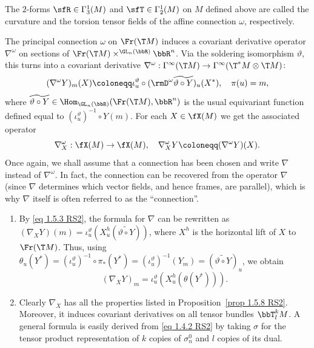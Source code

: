 \begin{defn}
    The $2$-forms $\sfR\in \Gamma_3^1(M)$ and $\sfT\in\Gamma_2^1(M)$ on $M$ defined above are called the curvature and the torsion tensor fields of the affine connection $\omega$, respectively.
\end{defn}


The principal connection $\omega$ on $\Fr(\T M)$ induces a covariant derivative operator $\nabla^\omega$ on sections of $\Fr(\T M)\times^{\GL_n(\bbR)}\bbR^n$. Via the soldering isomorphism $\vartheta$, this turns into a covariant derivative $\nabla^\omega:\Gamma^\infty(\T M)\to \Gamma^\infty(\T^\ast M\otimes \T M)$:
\[(\nabla^\omega Y)_m(X)\coloneqq \iota_u^\vartheta\circ (\rmD^\omega \widetilde{\vartheta\circ Y})_u(X^\ast),\quad \pi(u)=m,\]
where $\widetilde{\vartheta\circ Y}\in\Hom_{\GL_n(\bbR)}(\Fr(\T M),\bbR^n)$ is the usual equivariant function defined equal to $(\iota_u^\vartheta)^{-1}\circ Y(m)$. For each $X\in\fX(M)$ we get the associated operator
\[\nabla_X^\omega:\fX(M)\to \fX(M),\quad \nabla_X^\omega Y\coloneqq (\nabla^\omega Y)(X).\]
Once again, we shall assume that a connection has been chosen and write $\nabla$ instead of $\nabla^\omega$. In fact, the connection can be recovered from the operator $\nabla$ (since $\nabla$ determines which vector fields, and hence frames, are parallel), which is why $\nabla$ itself is often referred to as the ``connection''.

\begin{rem}\label{rem 2.1.17 RS2}
    \begin{enumerate}
        \item By \eqref{eq 1.5.3 RS2}, the formula for $\nabla$ can be rewritten as $(\nabla_X Y)(m)=\iota_u^\vartheta(X_u^h(\widetilde{\vartheta\circ Y}))$, where $X^h$ is the horizontal lift of $X$ to $\Fr(\T M)$. Thus, using $\theta_u(Y^\ast)=(\iota_u^\vartheta)^{-1}\circ\pi_\ast(Y^\ast)=(\iota_u^\vartheta)^{-1}(Y_m)=(\widetilde{\vartheta\circ Y})_u$, we obtain 
        \[(\nabla_X Y)_m=\iota_u^\vartheta(X_u^h(\theta(Y^\ast))).\label{eq 2.1.31 RS2}\]
        \item Clearly $\nabla_X$ has all the properties listed in Proposition~\ref{prop 1.5.8 RS2}. Moreover, it induces covariant derivatives on all tensor bundles $\bbT^k_l M$. A general formula is easily derived from \eqref{eq 1.4.2 RS2} by taking $\sigma$ for the tensor product representation of $k$ copies of $\sigma_n^0$ and $l$ copies of its dual.
    \end{enumerate}
\end{rem}

